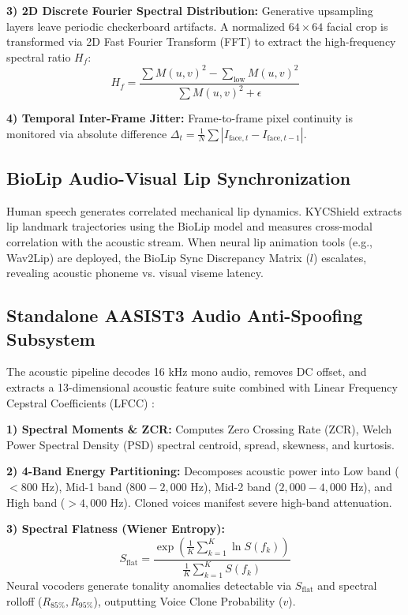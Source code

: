 \documentclass[conference]{IEEEtran}
\begin{document}
\textbf{3) 2D Discrete Fourier Spectral Distribution:} Generative upsampling layers leave periodic checkerboard artifacts. A normalized $64 \times 64$ facial crop is transformed via 2D Fast Fourier Transform (FFT) to extract the high-frequency spectral ratio $H_f$:
\begin{equation}
H_f = \frac{\sum M(u, v)^2 - \sum_{\text{low}} M(u, v)^2}{\sum M(u, v)^2 + \epsilon}
\end{equation}

\textbf{4) Temporal Inter-Frame Jitter:} Frame-to-frame pixel continuity is monitored via absolute difference $\Delta_t = \frac{1}{N}\sum |I_{\text{face}, t} - I_{\text{face}, t-1}|$.

\subsection{BioLip Audio-Visual Lip Synchronization}
Human speech generates correlated mechanical lip dynamics. KYCShield extracts lip landmark trajectories using the BioLip model and measures cross-modal correlation with the acoustic stream. When neural lip animation tools (e.g., Wav2Lip) are deployed, the BioLip Sync Discrepancy Matrix ($l$) escalates, revealing acoustic phoneme vs. visual viseme latency.

\subsection{Standalone AASIST3 Audio Anti-Spoofing Subsystem}
The acoustic pipeline decodes 16 kHz mono audio, removes DC offset, and extracts a 13-dimensional acoustic feature suite combined with Linear Frequency Cepstral Coefficients (LFCC) \cite{borodin2024aasist3}:

\textbf{1) Spectral Moments \& ZCR:} Computes Zero Crossing Rate (ZCR), Welch Power Spectral Density (PSD) spectral centroid, spread, skewness, and kurtosis.

\textbf{2) 4-Band Energy Partitioning:} Decomposes acoustic power into Low band ($<800\text{ Hz}$), Mid-1 band ($800 - 2,000\text{ Hz}$), Mid-2 band ($2,000 - 4,000\text{ Hz}$), and High band ($>4,000\text{ Hz}$). Cloned voices manifest severe high-band attenuation.

\textbf{3) Spectral Flatness (Wiener Entropy):}
\begin{equation}
S_{\text{flat}} = \frac{\exp\left(\frac{1}{K}\sum_{k=1}^K \ln S(f_k)\right)}{\frac{1}{K}\sum_{k=1}^K S(f_k)}
\end{equation}
Neural vocoders generate tonality anomalies detectable via $S_{\text{flat}}$ and spectral rolloff ($R_{85\%}, R_{95\%}$), outputting Voice Clone Probability ($v$).
\end{document}

